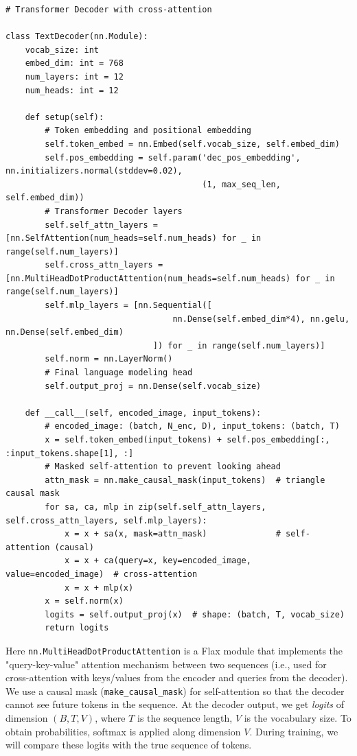 \documentclass{article}
\begin{document}
\begin{lstlisting}
# Transformer Decoder with cross-attention

class TextDecoder(nn.Module):
    vocab_size: int
    embed_dim: int = 768
    num_layers: int = 12
    num_heads: int = 12

    def setup(self):
        # Token embedding and positional embedding
        self.token_embed = nn.Embed(self.vocab_size, self.embed_dim)
        self.pos_embedding = self.param('dec_pos_embedding', nn.initializers.normal(stddev=0.02),
                                        (1, max_seq_len, self.embed_dim))
        # Transformer Decoder layers
        self.self_attn_layers = [nn.SelfAttention(num_heads=self.num_heads) for _ in range(self.num_layers)]
        self.cross_attn_layers = [nn.MultiHeadDotProductAttention(num_heads=self.num_heads) for _ in range(self.num_layers)]
        self.mlp_layers = [nn.Sequential([
                                  nn.Dense(self.embed_dim*4), nn.gelu, nn.Dense(self.embed_dim)
                              ]) for _ in range(self.num_layers)]
        self.norm = nn.LayerNorm()
        # Final language modeling head
        self.output_proj = nn.Dense(self.vocab_size)

    def __call__(self, encoded_image, input_tokens):
        # encoded_image: (batch, N_enc, D), input_tokens: (batch, T)
        x = self.token_embed(input_tokens) + self.pos_embedding[:, :input_tokens.shape[1], :]
        # Masked self-attention to prevent looking ahead
        attn_mask = nn.make_causal_mask(input_tokens)  # triangle causal mask
        for sa, ca, mlp in zip(self.self_attn_layers, self.cross_attn_layers, self.mlp_layers):
            x = x + sa(x, mask=attn_mask)              # self-attention (causal)
            x = x + ca(query=x, key=encoded_image, value=encoded_image)  # cross-attention
            x = x + mlp(x) 
        x = self.norm(x)
        logits = self.output_proj(x)  # shape: (batch, T, vocab_size)
        return logits
\end{lstlisting}

Here \texttt{nn.MultiHeadDotProductAttention} is a Flax module that implements the "query-key-value" attention mechanism between two sequences (i.e., used for cross-attention with keys/values from the encoder and queries from the decoder). We use a causal mask (\texttt{make_causal_mask}) for self-attention so that the decoder cannot see future tokens in the sequence. At the decoder output, we get \textit{logits} of dimension $(B, T, V)$, where $T$ is the sequence length, $V$ is the vocabulary size. To obtain probabilities, softmax is applied along dimension $V$. During training, we will compare these logits with the true sequence of tokens.
\end{document}
